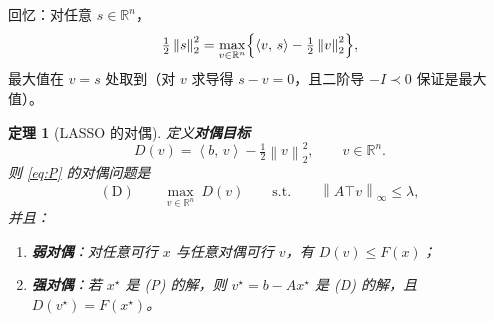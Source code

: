\documentclass[11pt,a4paper,UTF8]{ctexart}
\theoremstyle{plain}
\newtheorem{theorem}{定理}[section]
\theoremstyle{definition}
\theoremstyle{remark}
\newcommand{\R}{\mathbb{R}}
\newcommand{\norm}[1]{\left\lVert #1 \right\rVert}
\newcommand{\inner}[2]{\left\langle #1,\, #2 \right\rangle}
\begin{document}
回忆：对任意 $s\in\R^n$，
\begin{equation}
\tfrac12\norm{s}_2^2=\max_{v\in\R^n}\Bigl\{\inner{v}{s}-\tfrac12\norm{v}_2^2\Bigr\},
\label{eq:fenchelquad}
\end{equation}
最大值在 $v=s$ 处取到（对 $v$ 求导得 $s-v=0$，且二阶导 $-I\prec0$ 保证是最大值）。

\begin{theorem}[LASSO 的对偶]\label{thm:dual}
定义\textbf{对偶目标}
\[
D(v)=\inner{b}{v}-\tfrac12\norm{v}_2^2,\qquad v\in\R^n .
\]
则 \eqref{eq:P} 的对偶问题是
\begin{equation}
(\mathrm{D})\qquad \max_{v\in\R^n}\ D(v)\qquad\text{s.t.}\qquad \norm{A\top v}_\infty\le\lambda ,
\label{eq:dual}
\end{equation}
并且：
\begin{enumerate}
\item[(i)] \textbf{弱对偶}：对任意可行 $x$ 与任意对偶可行 $v$，有 $D(v)\le F(x)$；
\item[(ii)] \textbf{强对偶}：若 $x^\star$ 是 (P) 的解，则 $v^\star=b-Ax^\star$ 是 (D) 的解，且
      $D(v^\star)=F(x^\star)$。
\end{enumerate}
\end{theorem}
\end{document}
